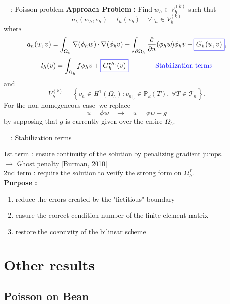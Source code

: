 \begin{frame}{\appendixname~\theappendixframenumber~: Poisson problem}
	\textbf{Approach Problem :} Find $w_h\in V_h^{(k)}$ such that 
	$$a_h(w_h,v_h) = l_h(v_h) \quad \forall v_h \in V_h^{(k)}$$
	where
	$$a_h(w,v)=\int_{\Omega_h} \nabla (\phi_h w) \cdot \nabla (\phi_h v) - \int_{\partial\Omega_h} \frac{\partial}{\partial n}(\phi_h w)\phi_h v+\fcolorbox{blue}{white}{$G_h(w,v)$},$$
	$$l_h(v)=\int_{\Omega_h} f \phi_h v + \fcolorbox{blue}{white}{$G_h^{rhs}(v)$} \qquad \qquad \color{blue}\text{Stabilization terms}$$
	and 
	$$V_h^{(k)}=\left\{v_h\in H^1(\Omega_h):v_{h|_T}\in\mathbb{P}_k(T), \; \forall T\in\mathcal{T}_h\right\}.$$
	For the non homogeneous case, we replace
	$$u=\phi w \quad \rightarrow \quad u=\phi w+g$$ 
	by supposing that $g$ is currently given over the entire $\Omega_h$.
\end{frame}

\begin{frame}{\appendixname~\theappendixframenumber~: Stabilization terms}
	\begin{center}
		\centering
	\end{center}
	\small
	\underline{1st term :} ensure continuity of the solution by penalizing gradient jumps. \\
	$\rightarrow$ Ghost penalty [Burman, 2010] \\
	\underline{2nd term :} require the solution to verify the strong form on $\Omega_h^\Gamma$. \\
	\normalsize
	\textbf{Purpose :} 
	\begin{enumerate}[\ding{217}]
		\item reduce the errors created by the "fictitious" boundary 
		\item ensure the correct condition number of the finite element matrix
		\item restore the coercivity of the bilinear scheme
	\end{enumerate}
\end{frame}
\addtocounter{appendixframenumber}{1}

\section{Other results}

\subsection{Poisson on Bean}


